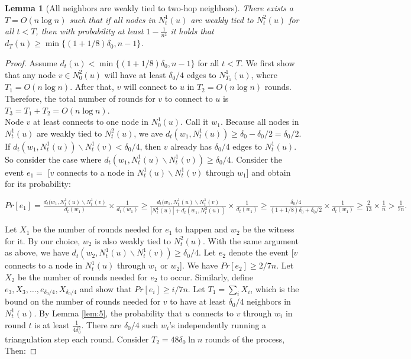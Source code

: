\documentclass[
10pt, %
a4paper, %
oneside, %
headinclude,footinclude, %
BCOR5mm, %
]{scrartcl}
\newtheorem{lemma}[theorem]{\textbf{Lemma}}
\begin{document}
\begin{lemma}[All neighbors are weakly tied to two-hop neighbors]\label{lem:8}
	There exists a $T = O(n\log n)$ such that if all nodes in $N_t^1(u)$ are weakly tied to $N_t^2(u)$ for all $t < T$, then with probability at least $1 - \frac{1}{n^2}$ it holds that $d_T(u) \geq \min \{(1+ 1/8)\delta_0, n - 1\}$.
\end{lemma}
\begin{proof}
	Assume $d_t(u) < \min \{(1+ 1/8)\delta_0, n - 1\}$ for all $t < T$. We first show that any node $v \in N_0^2(u)$ will have at least $\delta_0/4$ edges to $N_{T_1}^1(u)$, where $T_1 = O(n\log n)$. After that, $v$ will connect to $u$ in $T_2 = O(n\log n)$ rounds. Therefore, the total number of rounds for $v$ to connect to $u$ is $T_3 = T_1 + T_2 = O(n\log n)$. \\
	Node $v$ at least connects to one node in $N_0^1(u)$. Call it $w_1$. Because all nodes in $N_t^1(u)$ are weakly tied to $N_t^2(u)$, we ave $d_t(w_1, N_t^1(u)) \geq \delta_0 - \delta_0/2 = \delta_0 /2 $. If $d_t(w_1, N_t^1(u)) \backslash N_t^1(v) < \delta_0/4$, then $v$ already has $\delta_0/4$ edges to $N_t^1(u)$. So consider the case where $d_t(w_1, N_t^1(u) \backslash N_t^1(v)) \geq \delta_0/4$. Consider the event $e_1=$ [$v$ connects to a node in $N_t^1(u) \backslash N_t^1(v)$ through $w_1$] and obtain for its probability:
	\begin{center}
		\begin{math}
			Pr[e_1] = \frac{d_t(w_1, N_t^1(u) \backslash N_t^1(v)}{d_t(w_1)} \times \frac{1}{d_t(w_1)} \geq
			\frac{d_t(w_1, N_t^1(u) \backslash N_t^1(v)}{|N_t^1(u)| + d_t(w_1, N_t^2(u))} \times \frac{1}{d_t(w_1)} \geq 
			\frac{\delta_0/4}{(1+1/8)\delta_0 + \delta_0/2} \times \frac{1}{d_t(w_1)} \geq
			\frac{2}{13} \times \frac{1}{n} > \frac{1}{7n}.
		\end{math}
	\end{center}
	Let $X_1$ be the number of rounds needed for $e_1$ to happen and $w_2$ be the witness for it. By our choice, $w_2$ is also weakly tied to $N_t^2(u)$. With the same argument as above, we have $d_t(w_2,  N_t^1(u) \backslash N_t^1(v)) \geq \delta_0/4$. Let $e_2$ denote the event  [$v$ connects to a node in $N_t^1(u)$ through $w_1$ or $w_2$]. We have $Pr[e_2] \geq 2/7n$. Let $X_2$ be the number of rounds needed for $e_2$ to occur. Similarly, define $e_3, X_3, \ldots, e_{\delta_0/4}, X_{\delta_0/4}$ and show that $Pr[e_i] \geq i/7n$. Let $T_1 = \sum_{i}X_i$, which is the bound on the number of rounds needed for $v$ to have at least $\delta_0/4$ neighbors in $N_t^1(u)$. By Lemma \ref{lem:5}, the probability that $u$ connects to $v$ through $w_i$ in round $t$ is at least $\frac{1}{4\delta_0^2}$. There are $\delta_0/4$ such $w_i$'s independently running a triangulation step each round. Consider $T_2 = 48\delta_0 \ln n$ rounds of the process, Then:

\end{proof}
\end{document}
